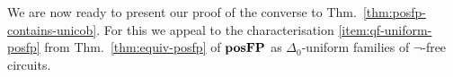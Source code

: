 \documentclass{lmcs}
\begin{document}
We are now ready to present our proof of the converse to Thm.~\ref{thm:posfp-contains-unicob}.
For this we appeal to the characterisation \eqref{item:qf-uniform-posfp} from Thm.~\ref{thm:equiv-posfp} of $\mathbf{pos}\mathbf{FP}$ as $\Delta_0$-uniform families of $\neg$-free circuits.
%
%
%		
%		
\end{document}
